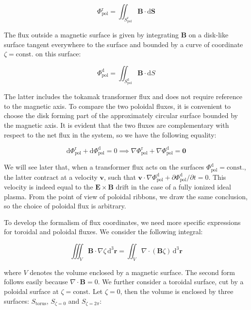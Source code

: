 \begin{equation}
    \Phi_\text{pol}^\text{r}=\iint_{S_\text{pol}^\text{r}}\mathbf{B}\cdot\mathrm{d}\mathbf{S}
\end{equation}

The flux outside a magnetic surface is given by integrating $\mathbf{B}$ on a disk-like surface tangent everywhere to the surface and bounded by a curve of coordinate $\zeta=\text{const.}$ on this surface:

\begin{equation}
    \Phi_\text{pol}^\mathrm{d}=\iint_{S_\text{pol}^\mathrm{d}}\mathbf{B}\cdot\mathrm{d}S
\end{equation}

The latter includes the tokamak transformer flux and does not require reference to the magnetic axis. To compare the two poloidal fluxes, it is convenient to choose the disk forming part of the approximately circular surface bounded by the magnetic axis. It is evident that the two fluxes are complementary with respect to the net flux in the system, so we have the following equality:

\begin{equation}
    \label{eq-5-32}
    \mathrm{d}\Phi_\text{pol}^\text{r}+\mathrm{d}\Phi_\text{pol}^\mathrm{d}=0\implies\nabla\Phi_\text{pol}^\text{r}+\nabla\Phi_\text{pol}^\mathrm{d}=\mathbf{0}
\end{equation}

We will see later that, when a transformer flux acts on the surfaces $\Phi_\text{pol}^\mathrm{d}=\text{const.}$, the latter contract at a velocity $\mathbf{v}$, such that $\mathbf{v}\cdot\nabla\Phi_\text{pol}^\mathrm{d}+\partial\Phi_\text{pol}^\mathrm{d}/\partial t=0$. This velocity is indeed equal to the $\mathbf{E}\times\mathbf{B}$ drift in the case of a fully ionized ideal plasma. From the point of view of poloidal ribbons, we draw the same conclusion, so the choice of poloidal flux is arbitrary.

\quad To develop the formalism of flux coordinates, we need more specific expressions for toroidal and poloidal fluxes. We consider the following integral:

\begin{equation}
    \iiint_V\mathbf{B}\cdot\nabla\zeta\,\mathrm{d}^3\mathbf{r}=\iint_V\nabla\cdot(\mathbf{B}\zeta)\,\mathrm{d}^3\mathbf{r}
\end{equation}

where $V$ denotes the volume enclosed by a magnetic surface. The second form follows easily because $\nabla\cdot\mathbf{B}=0$. We further consider a toroidal surface, cut by a poloidal surface at $\zeta=\text{const}$. Let $\zeta=0$, then the volume is enclosed by three surfaces: $S_\text{torus}$, $S_{\zeta=0}$ and $S_{\zeta=2\pi}$:

